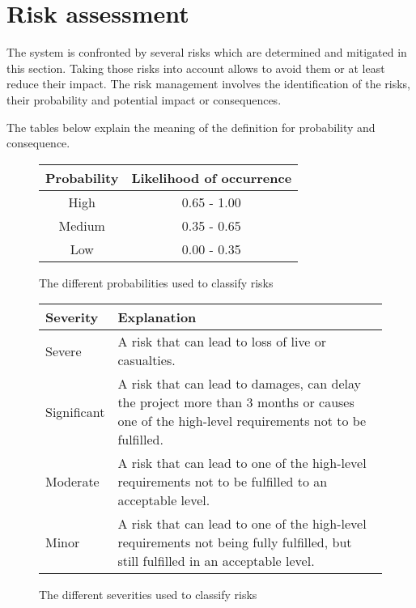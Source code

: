 \newpage
\section{Risk assessment}
\label{sec:risk-assesment}

The system is confronted by several risks which are determined and mitigated in this section.
Taking those risks into account allows to avoid them or at least reduce their impact. 
The risk management involves the identification of the risks, their probability and potential impact or consequences.

The tables below explain the meaning of the definition for probability and consequence.
\begin{figure}[H]
	\centering
	\begin{tabular}{|c|c|}
		\hline \textbf{Probability} & \textbf{Likelihood of occurrence} \\ 
		\hline High                 & 0.65 - 1.00                       \\ 
		\hline Medium               & 0.35 - 0.65                       \\ 
		\hline Low                  & 0.00 - 0.35                       \\ 
		\hline
	\end{tabular} 
	\caption{The different probabilities used to classify risks}
	\label{table:risk-probability}
\end{figure}

\begin{figure}[H]
	\centering
	\begin{tabular}{|l|p{15.5cm}|}
		\hline \textbf{Severity} & \textbf{Explanation}                                                                                                                        \\ 
		\hline Severe            & A risk that can lead to loss of live or casualties.                                                                                         \\ 
		\hline Significant       & A risk that can lead to damages, can delay the project more than 3 months or causes one of the high-level requirements not to be fulfilled. \\ 
		\hline Moderate          & A risk that can lead to one of the high-level requirements not to be fulfilled to an acceptable level.                                      \\ 
		\hline Minor             & A risk that can lead to one of the high-level requirements not being fully fulfilled, but still fulfilled in an acceptable level.           \\
		\hline
	\end{tabular} 
	\caption{The different severities used to classify risks}
	\label{table:risk-severity}
\end{figure}


